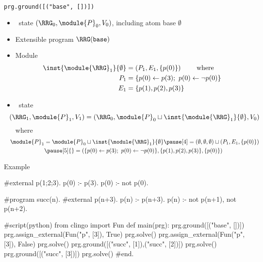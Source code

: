 \begin{frame}{\texttt{prg.ground([("base", [])])}}
  \begin{itemize}
  \item {} \clingo\ state $(\boldsymbol{\RRG}_0,\module{P}_0,V_0 )$, including atom base $\emptyset$
  \item {}  Extensible program $\RRG(\mathtt{base})$
  \item<2->  Module
      \begin{align*}
        \inst{\module{\RRG}_1}{\emptyset} & {} = (P_1,E_1,\{p(0)\})   \qquad\text{ where}\\
        P_1 & {} = \{p(0)\leftarrow p(3);\ p(0)\leftarrow \neg p(0)\}             \\
        E_1 & {} = \{p(1),p(2),p(3)\}
      \end{align*}
  \item<3->  \clingo\ state
    \[
    \hspace{-10pt}
    (\boldsymbol{\RRG}_1,\module{P}_1,V_1 )
    =
    (
     \boldsymbol{\RRG}_0,\module{P}_0 \sqcup \inst{\module{\RRG}_1}{\emptyset},V_0
    )
    \]
    where
    \begin{align*}
    \hspace{-10pt}
      \module{P}_1
      & {} =
      \module{P}_0 \sqcup \inst{\module{\RRG}_1}{\emptyset}
      \pause[4] =
      (\emptyset,\emptyset,\emptyset) \sqcup (P_1,E_1,\{p(0)\})\\
      &\pause[5] {} =
      (
      \{
      p(0)\leftarrow p(3);\
      p(0)\leftarrow \neg p(0)
      \},
      \{p(1),p(2),p(3)\},
      \{p(0)\}
      )
    \end{align*}
  \end{itemize}
\end{frame}
\begin{frame}[fragile]{Example}
\scriptsize\vspace{-10pt}%
\begin{semiverbatim}
   #external p(1;2;3).
   p(0) :- p(3).
   p(0) :- not p(0).

   #program succ(n).
   #external p(n+3).
   p(n) :- p(n+3).
   p(n) :- not p(n+1), not p(n+2).

   #script(python)
   from clingo import Fun
   def main(prg):
     \alert<1>{prg.ground([("base", [])])}
\only<2>{\alert{>>}}\only<1>{  }     \alert<2>{prg.assign_external(Fun("p", [3]), True)}
       prg.solve()
       prg.assign_external(Fun("p", [3]), False)
       prg.solve()
       prg.ground([("succ", [1]),("succ", [2])])
       prg.solve()
       prg.ground([("succ", [3])])
       prg.solve()
   #end.
\end{semiverbatim}
\end{frame}
